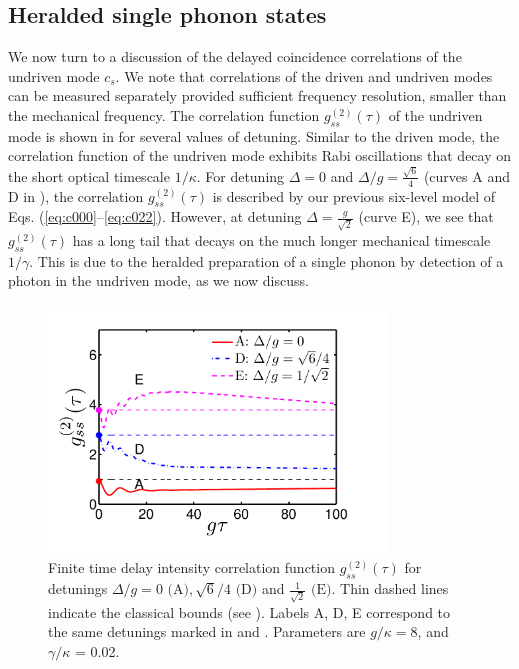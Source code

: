 



\subsection{Heralded single phonon states}

We now turn to a discussion of the delayed coincidence
correlations of the undriven mode $c_s$.
We note that correlations of the driven
and undriven modes can be measured separately
provided sufficient frequency resolution, smaller than
  the mechanical frequency.
The correlation function
$g^{(2)}_{ss}(\tau)$
of the undriven mode
is shown in  for several
values of detuning.
Similar to the driven mode, the
correlation function of the undriven mode
exhibits Rabi oscillations 
that decay on the short optical
timescale
$1/\kappa$.
For detuning $\Delta = 0$ and 
$\Delta/g = \frac{\sqrt{6}}{4}$
(curves A and D in ),
the correlation $g^{(2)}_{ss}(\tau)$
is described by
our previous six-level 
model of Eqs. (\ref{eq:c000}--\ref{eq:c022}).
However,  at detuning $\Delta = \frac{g}{\sqrt{2}}$
(curve E), we see that
$g^{(2)}_{ss}(\tau)$ has a long
tail that decays
on the much longer mechanical timescale $1/\gamma$.
This is due to the heralded preparation
of a single phonon by detection of a photon in the
undriven mode, as we now discuss.
\begin{figure}[htb] \centering
  \includegraphics[width=0.8\textwidth]{./figs_Komar2013/fig6.pdf}
  \caption[Autocorrelation of mode $s$]
  {
  \label{fig:g2sstau}
  Finite time delay intensity correlation function $g^{(2)}_{ss}(\tau)$
  for detunings $\Delta/g = 0 \text{ (A)}, \sqrt{6}/4 \text{ (D)}$
  and
  $\frac{1}{\sqrt{2}} \text{ (E)}$.
  Thin dashed lines indicate the classical bounds
  (see  ).
  Labels A, D, E correspond to the same detunings
  marked in 
  and
  .
  Parameters are $g/\kappa = 8$, and $\gamma/\kappa$ = 0.02.
  }
\end{figure}



